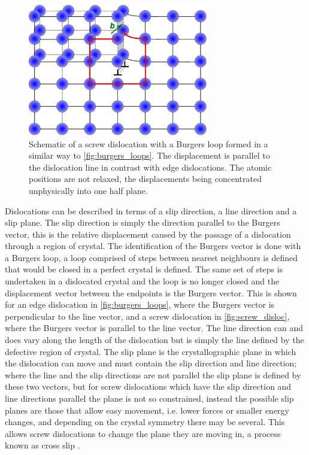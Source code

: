 \begin{figure}
\centering
\includegraphics[width=0.7\textwidth]{screw_disloc_loop}
\caption{Schematic of a screw dislocation with a Burgers loop formed in a similar way to \autoref{fig:burgers_loops}. The displacement is parallel to the dislocation line in contrast with edge dislocations. The atomic positions are not relaxed, the displacements being concentrated unphysically into one half plane. \label{fig:screw_disloc}}
\end{figure}




Dislocations can be described in terms of a slip direction, a line direction and a slip plane. The slip direction is simply the direction parallel to the Burgers vector, this is the relative displacement caused by the passage of a dislocation through a region of crystal. The identification of the Burgers vector is done with a Burgers loop, a loop comprised of steps between nearest neighbours is defined that would be closed in a perfect crystal is defined. The same set of steps is undertaken in a dislocated crystal and the loop is no longer closed and the displacement vector between the endpoints is the Burgers vector. This is shown for an edge dislocation in \autoref{fig:burgers_loops}, where the Burgers vector is perpendicular to the line vector, and a screw dislocation in \autoref{fig:screw_disloc}, where the Burgers vector is parallel to the line vector. The line direction can and does vary along the length of the dislocation but is simply the line defined by the defective region of crystal. The slip plane is the crystallographic plane in which the dislocation can move and must contain the slip direction and line direction; where the line and the slip directions are not parallel the slip plane is defined by these two vectors, but for screw dislocations which have the slip direction and line directions parallel the plane is not so constrained, instead the possible slip planes are those that allow easy movement, i.e. lower forces or smaller energy changes, and depending on the crystal symmetry there may be several. This allows screw dislocations to change the plane they are moving in, a process known as cross slip \cite{Hirth_Lothe1982intro}.

